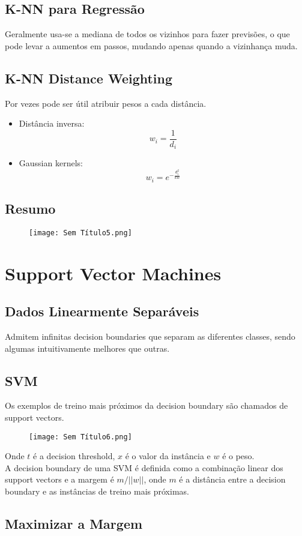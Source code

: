 \documentclass[10pt,a4paper]{report}
\begin{document}
\subsection{K-NN para Regressão}
Geralmente usa-se a mediana de todos os vizinhos para fazer previsões, o que pode levar a aumentos em passos, mudando apenas quando a vizinhança muda.
\subsection{K-NN Distance Weighting}
Por vezes pode ser útil atribuir pesos a cada distância.
\begin{itemize}
\item Distância inversa: $$w_i = \frac{1}{d_i}$$
\item Gaussian kernels: $$w_i = e^{-\frac{d_i^2}{kw}}$$
\end{itemize}
\subsection{Resumo}
\begin{figure}[H]
\centering
\texttt{[image: Sem Título5.png]}
\end{figure}
\section{Support Vector Machines}
\subsection{Dados Linearmente Separáveis}
Admitem infinitas decision boundaries que separam as diferentes classes, sendo algumas intuitivamente melhores que outras.
\subsection{SVM}
Os exemplos de treino mais próximos da decision boundary são chamados de support vectors.
\begin{figure}[H]
\centering
\texttt{[image: Sem Título6.png]}
\end{figure}
Onde $t$ é a decision threshold, $x$ é o valor da instância e $w$ é o peso.\\
A decision boundary de uma SVM é definida como a combinação linear dos support vectors e a margem é $m / ||w||$, onde $m$ é a distância entre a decision boundary e as instâncias de treino mais próximas.
\subsection{Maximizar a Margem}
\end{document}
